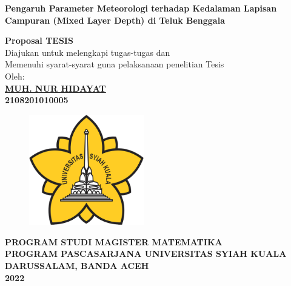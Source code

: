 \begin{spacing}{1}
	\begin{center}
		{\Large\textbf{Pengaruh Parameter Meteorologi terhadap Kedalaman Lapisan Campuran (Mixed Layer Depth) di Teluk Benggala}}\\[1.0cm]
	\end{center}
	\vspace*{0.8cm} 
	
	\begin{center}
		
		\large{\textbf{Proposal TESIS}}
		\\\vspace*{1.8cm}    
		\normalsize{Diajukan untuk melengkapi tugas-tugas dan \\
			Memenuhi syarat-syarat guna pelaksanaan penelitian Tesis}\\[1.5cm]
		\vspace*{1cm}  
		{\large Oleh:}\\
		\vspace*{1cm}       
		\large{\textbf{\underline{MUH. NUR HIDAYAT}}}
		\\\large{\textbf{2108201010005}} 
	\end{center}\vspace*{1cm}   
	
	\begin{figure}[h]
		\centering
		\includegraphics[width=5cm]{contents/USK} %
	\end{figure}
	\vspace*{1.5cm}   
	
	\begin{center}
		\textbf{PROGRAM STUDI MAGISTER MATEMATIKA \\
			PROGRAM PASCASARJANA UNIVERSITAS SYIAH KUALA\\
			DARUSSALAM, BANDA ACEH\\
			2022}
	\end{center}
	\thispagestyle{empty}
\end{spacing}